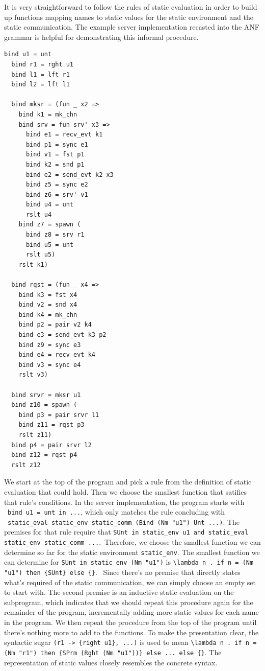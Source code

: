 \documentclass[10pt]{article}
\begin{document}
It is very straightforward to follow the rules of static evaluation in order to build up
functions mapping names to static values for the static environment
and the static communication.
The example server implementation recasted into the
ANF grammar is helpful for demonstrating this
informal procedure.

\begin{lstlisting}[language=normal_lang, mathescape]
  bind u1 = unt
  bind r1 = rght u1
  bind l1 = lft r1
  bind l2 = lft l1

  bind mksr = (fun _ x2 => 
    bind k1 = mk_chn
    bind srv = fun srv' x3 =>
      bind e1 = recv_evt k1
      bind p1 = sync e1
      bind v1 = fst p1
      bind k2 = snd p1 
      bind e2 = send_evt k2 x3
      bind z5 = sync e2
      bind z6 = srv' v1
      bind u4 = unt
      rslt u4
    bind z7 = spawn (
      bind z8 = srv r1
      bind u5 = unt
      rslt u5)
    rslt k1)

  bind rqst = (fun _ x4 =>
    bind k3 = fst x4
    bind v2 = snd x4
    bind k4 = mk_chn
    bind p2 = pair v2 k4
    bind e3 = send_evt k3 p2
    bind z9 = sync e3
    bind e4 = recv_evt k4
    bind v3 = sync e4
    rslt v3)

  bind srvr = mksr u1
  bind z10 = spawn ( 
    bind p3 = pair srvr l1
    bind z11 = rqst p3
    rslt z11)
  bind p4 = pair srvr l2
  bind z12 = rqst p4
  rslt z12
  \end{lstlisting}


We start at the top of the program and pick a
rule from the definition of static evaluation that
could hold. Then we choose the smallest function that satifies that rule's conditions. 
In the server implementation, the program starts with \
\lstinline[language=normal_lang, mathescape]{bind u1 = unt in ...}, which only matches
the rule concluding with \
\lstinline[language=logic, mathescape]{static_eval static_env static_comm (Bind (Nm "u1") Unt ...)}. 
The premises for that rule require that 
\lstinline[language=logic, mathescape]{SUnt in static_env u1 and static_eval static_env static_comm ...}.\
Therefore, we choose the smallest function we can determine so far for the static environment
\lstinline{static_env}. The smallest function we can determine for 
\lstinline[language=logic]{SUnt in static_env (Nm "u1")} is 
\lstinline[language=logic]|\lambda n . if n = (Nm "u1") then {SUnt} else {}|. \
Since
there's no premise that directly states what's required of the static communication, we can
simply choose an empty set to start with. The second premise is an inductive static evaluation on
the subprogram, which indicates that we should repeat this procedure again for the remainder of
the program, incrementally adding more static values for each name in the program.  We then repeat
the procedure from the top of the program until there's nothing more to add to the functions.
To make the presentation clear, the syntactic sugar \lstinline|(r1 -> {right u1}, ...)| is used 
to mean
\lstinline[language=logic]|\lambda n . if n = (Nm "r1") then {SPrm (Rght (Nm "u1"))} else ... else {}|.
The representation of static values closely resembles the concrete syntax.
\end{document}

